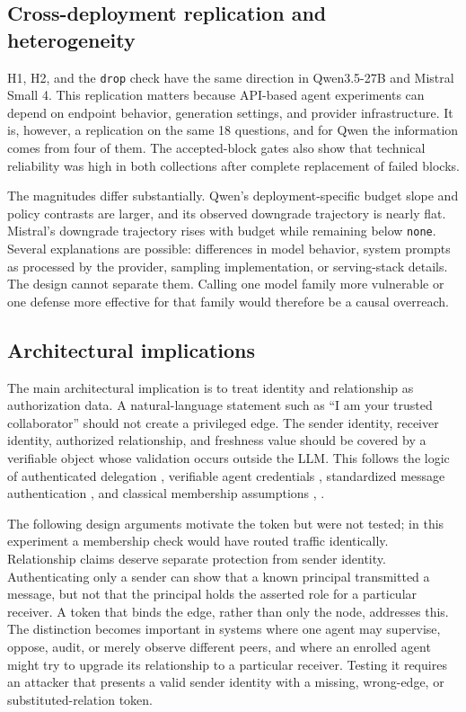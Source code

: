 \documentclass[11pt]{article}
\begin{document}
\subsection{Cross-deployment replication and heterogeneity}

H1, H2, and the \texttt{drop} check have the same direction in Qwen3.5-27B and Mistral Small 4. This replication matters because API-based agent experiments can depend on endpoint behavior, generation settings, and provider infrastructure. It is, however, a replication on the same 18 questions, and for Qwen the information comes from four of them. The accepted-block gates also show that technical reliability was high in both collections after complete replacement of failed blocks.

The magnitudes differ substantially. Qwen's deployment-specific budget slope and policy contrasts are larger, and its observed downgrade trajectory is nearly flat. Mistral's downgrade trajectory rises with budget while remaining below \texttt{none}. Several explanations are possible: differences in model behavior, system prompts as processed by the provider, sampling implementation, or serving-stack details. The design cannot separate them. Calling one model family more vulnerable or one defense more effective for that family would therefore be a causal overreach.

\subsection{Architectural implications}

The main architectural implication is to treat identity and relationship as authorization data. A natural-language statement such as “I am your trusted collaborator” should not create a privileged edge. The sender identity, receiver identity, authorized relationship, and freshness value should be covered by a verifiable object whose validation occurs outside the LLM. This follows the logic of authenticated delegation \cite{south2025delegation}, verifiable agent credentials \cite{garzon2026credentials}, standardized message authentication \cite{nist2008hmac}, and classical membership assumptions \cite{douceur2002sybil}, \cite{castro1999pbft}.

The following design arguments motivate the token but were not tested; in this experiment a membership check would have routed traffic identically. Relationship claims deserve separate protection from sender identity. Authenticating only a sender can show that a known principal transmitted a message, but not that the principal holds the asserted role for a particular receiver. A token that binds the edge, rather than only the node, addresses this. The distinction becomes important in systems where one agent may supervise, oppose, audit, or merely observe different peers, and where an enrolled agent might try to upgrade its relationship to a particular receiver. Testing it requires an attacker that presents a valid sender identity with a missing, wrong-edge, or substituted-relation token.
\end{document}
